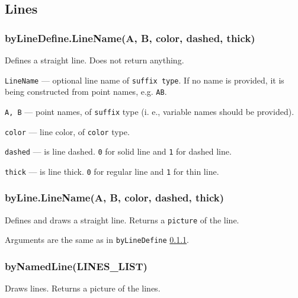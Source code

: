 \documentclass{ltxdoc}
\begin{document}



\subsection{Lines}


\subsubsection{byLineDefine.LineName(A, B, color, dashed, thick)}\label{byLineDefine}

	Defines a straight line. Does not return anything.
	
	\texttt{LineName} — optional line name of \texttt{suffix type}. If no name is provided, it is being constructed from point names, e.g. \texttt{AB}.
	
	\texttt{A, B} — point names, of \texttt{suffix} type (i. e., variable names should be provided).
	
	\texttt{color} — line color, of \texttt{color} type.
	
	\texttt{dashed} — is line dashed. \texttt{0} for solid line and \texttt{1} for dashed line.
	
	\texttt{thick} — is line thick. \texttt{0} for regular line and \texttt{1} for thin line.


\subsubsection{byLine.LineName(A, B, color, dashed, thick)}\label{byLine}

	Defines and draws a straight line. Returns a \texttt{picture} of the line.
	
	Arguments are the same as in \texttt{byLineDefine} \ref{byLineDefine}.


\subsubsection{byNamedLine(LINES\_LIST)}\label{byNamedLine}

	Draws lines. Returns a picture of the lines.
	
\end{document}

